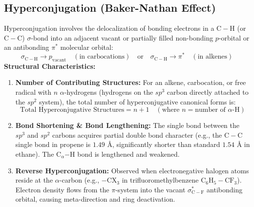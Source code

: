 \documentclass[10pt,twoside,openright]{book}
\begin{document}
\subsection{Hyperconjugation (Baker-Nathan Effect)}

\begin{conceptbox}
Hyperconjugation involves the delocalization of bonding electrons in a $\mathrm{C-H}$ (or $\mathrm{C-C}$) $\sigma$-bond into an adjacent vacant or partially filled non-bonding $p$-orbital or an antibonding $\pi^*$ molecular orbital:
\begin{equation}
  \sigma_{\mathrm{C-H}} \longrightarrow p_{\text{vacant}} \quad (\text{in carbocations}) \quad \text{or} \quad \sigma_{\mathrm{C-H}} \longrightarrow \pi^* \quad (\text{in alkenes})
\end{equation}
\textbf{Structural Characteristics:}
\begin{enumerate}[leftmargin=*]
  \item \textbf{Number of Contributing Structures:} For an alkene, carbocation, or free radical with $n$ $\alpha$-hydrogens (hydrogens on the $sp^3$ carbon directly attached to the $sp^2$ system), the total number of hyperconjugative canonical forms is:
  \begin{equation}
    \text{Total Hyperconjugative Structures} = n + 1 \quad (\text{where } n = \text{number of } \alpha\text{-H})
  \end{equation}
  \item \textbf{Bond Shortening \& Bond Lengthening:} The single bond between the $sp^3$ and $sp^2$ carbons acquires partial double bond character (e.g., the $\mathrm{C-C}$ single bond in propene is $1.49\text{ \AA}$, significantly shorter than standard $1.54\text{ \AA}$ in ethane). The $\mathrm{C}_\alpha\mathrm{-H}$ bond is lengthened and weakened.
  \item \textbf{Reverse Hyperconjugation:} Observed when electronegative halogen atoms reside at the $\alpha$-carbon (e.g., $-\mathrm{CX_3}$ in trifluoromethylbenzene $\mathrm{C_6H_5-CF_3}$). Electron density flows from the $\pi$-system into the vacant $\sigma^*_{\mathrm{C-F}}$ antibonding orbital, causing meta-direction and ring deactivation.
\end{enumerate}
\end{conceptbox}
\end{document}
